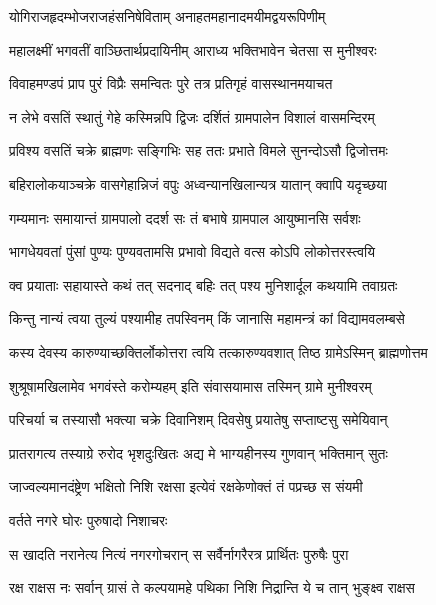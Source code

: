 \twolineshloka
{योगिराजहृदम्भोजराजहंसनिषेविताम्}
{अनाहतमहानादमयीमद्वयरूपिणीम्} %

\twolineshloka
{महालक्ष्मीं भगवतीं वाञ्छितार्थप्रदायिनीम्}
{आराध्य भक्तिभावेन चेतसा स मुनीश्वरः} %

\twolineshloka
{विवाहमण्डपं प्राप पुरं विप्रैः समन्वितः}
{पुरे तत्र प्रतिगृहं वासस्थानमयाचत} %

\twolineshloka
{न लेभे वसतिं स्थातुं गेहे कस्मिन्नपि द्विजः}
{दर्शितं ग्रामपालेन विशालं वासमन्दिरम्} %

\twolineshloka
{प्रविश्य वसतिं चक्रे ब्राह्मणः सङ्गिभिः सह}
{ततः प्रभाते विमले सुनन्दोऽसौ द्विजोत्तमः} %

\twolineshloka
{बहिरालोकयाञ्चक्रे वासगेहान्निजं वपुः}
{अध्वन्यानखिलान्यत्र यातान् क्वापि यदृच्छया} %

\twolineshloka
{गम्यमानः समायान्तं ग्रामपालो ददर्श सः}
{तं बभाषे ग्रामपाल आयुष्मानसि सर्वशः} %

\twolineshloka
{भागधेयवतां पुंसां पुण्यः पुण्यवतामसि}
{प्रभावो विद्यते वत्स कोऽपि लोकोत्तरस्त्वयि} %

\twolineshloka
{क्व प्रयाताः सहायास्ते कथं तत् सदनाद् बहिः}
{तत् पश्य मुनिशार्दूल कथयामि तवाग्रतः} %

\twolineshloka
{किन्तु नान्यं त्वया तुल्यं पश्यामीह तपस्विनम्}
{किं जानासि महामन्त्रं कां विद्यामवलम्बसे} %

\twolineshloka
{कस्य देवस्य कारुण्याच्छक्तिर्लोकोत्तरा त्वयि}
{तत्कारुण्यवशात् तिष्ठ ग्रामेऽस्मिन् ब्राह्मणोत्तम} %

\twolineshloka
{शुश्रूषामखिलामेव भगवंस्ते करोम्यहम्}
{इति संवासयामास तस्मिन् ग्रामे मुनीश्वरम्} %

\twolineshloka
{परिचर्या च तस्यासौ भक्त्या चक्रे दिवानिशम्}
{दिवसेषु प्रयातेषु सप्ताष्टसु समेयिवान्} %

\twolineshloka
{प्रातरागत्य तस्याग्रे रुरोद भृशदुःखितः}
{अद्य मे भाग्यहीनस्य गुणवान् भक्तिमान् सुतः} %

\twolineshloka
{जाज्वल्यमानदंष्ट्रेण भक्षितो निशि रक्षसा}
{इत्येवं रक्षकेणोक्तं तं पप्रच्छ स संयमी} %



\onelineshloka
{वर्तते नगरे घोरः पुरुषादो निशाचरः} %

\twolineshloka
{स खादति नरानेत्य नित्यं नगरगोचरान्}
{स सर्वैर्नागरैरत्र प्रार्थितः पुरुषैः पुरा} %

\twolineshloka
{रक्ष राक्षस नः सर्वान् ग्रासं ते कल्पयामहे}
{पथिका निशि निद्रान्ति ये च तान् भुङ्क्ष्व राक्षस} %

